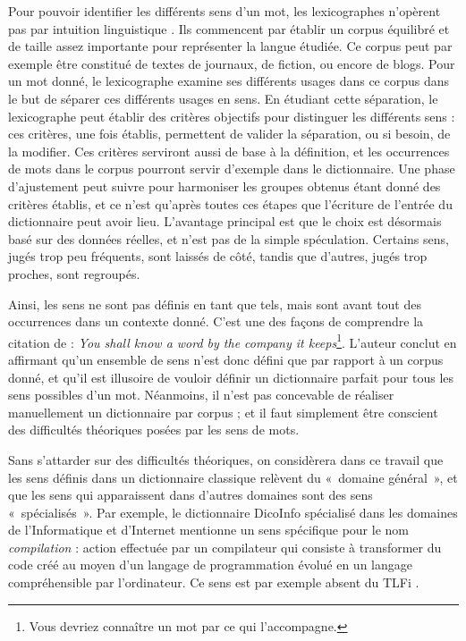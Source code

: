 Pour pouvoir identifier les différents sens d'un mot, les lexicographes
n'opèrent pas par intuition linguistique \citep{kilgarriff1997don}. Ils
commencent par établir un corpus équilibré et de taille assez importante pour
représenter la langue étudiée. Ce corpus peut par exemple être constitué de
textes de journaux, de fiction, ou encore de blogs. Pour un mot donné, le
lexicographe examine ses différents usages dans ce corpus dans le but de
séparer ces différents usages en sens. En étudiant cette séparation, le
lexicographe peut établir des critères objectifs pour distinguer les différents
sens : ces critères, une fois établis, permettent de valider la séparation, ou
si besoin, de la modifier. Ces critères serviront aussi de base à la
définition, et les occurrences de mots dans le corpus pourront servir d'exemple
dans le dictionnaire. Une phase d'ajustement peut suivre pour harmoniser les
groupes obtenus étant donné des critères établis, et ce n'est qu'après toutes
ces étapes que l'écriture de l'entrée du dictionnaire peut avoir lieu.
L'avantage principal est que le choix est désormais basé sur des données
réelles, et n'est pas de la simple spéculation. Certains sens, jugés trop peu
fréquents, sont laissés de côté, tandis que d'autres, jugés trop proches, sont
regroupés.


Ainsi, les sens ne sont pas définis en tant que tels, mais sont avant tout des
occurrences dans un contexte donné. C'est une des façons de comprendre la
citation de \citep{firth1957synopsys} : \emph{You shall know a word by the
company it keeps}\footnote{Vous devriez connaître un mot par ce qui
l'accompagne.}.  L'auteur conclut en affirmant qu'un ensemble de sens n'est
donc défini que par rapport à un corpus donné, et qu'il est illusoire de
vouloir définir un dictionnaire parfait pour tous les sens possibles d'un mot.
Néanmoins, il n'est pas concevable de réaliser manuellement un dictionnaire par
corpus ; et il faut simplement être conscient des difficultés théoriques posées
par les sens de mots.

Sans s'attarder sur des difficultés théoriques, on considèrera dans ce travail
que les sens définis dans un dictionnaire classique relèvent du «~domaine
général~», et que les sens qui apparaissent dans d'autres domaines sont des
sens «~spécialisés~». Par exemple, le dictionnaire DicoInfo \citep{corpusolst}
spécialisé dans les domaines de l'Informatique et d'Internet mentionne un sens
spécifique pour le nom \emph{compilation} : action effectuée par un compilateur
qui consiste à transformer du code créé au moyen d'un langage de programmation
évolué en un langage compréhensible par l'ordinateur. Ce sens est par exemple
absent du TLFi \citep{TLFi}.

